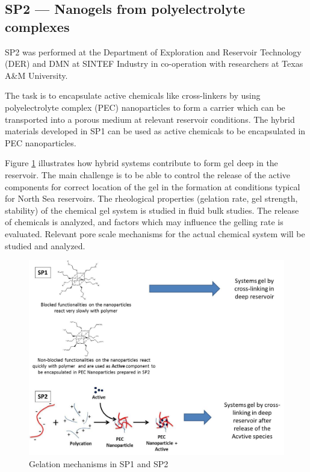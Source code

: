 \subsection*{SP2 --- Nanogels from polyelectrolyte complexes}

SP2 was performed at the Department of Exploration and Reservoir Technology (DER) and DMN at SINTEF Industry in co-operation with researchers at Texas A\&M University.

The task is to encapsulate active chemicals like cross-linkers by using polyelectrolyte complex  (PEC) nanoparticles to form a carrier which can be transported into a porous medium at relevant reservoir conditions. The hybrid materials developed in SP1 can be used as active chemicals to be encapsulated in PEC nanoparticles. 

Figure \ref{fig:sp1sp2} illustrates how hybrid systems contribute to form gel deep in the reservoir. The main challenge is to be able to control the release of the active components for correct location of the gel in the formation at conditions typical for North Sea reservoirs. The rheological properties (gelation rate, gel strength, stability) of the chemical gel system is studied in fluid bulk studies. The release of chemicals is analyzed, and factors which may influence the gelling rate is evaluated. Relevant pore scale mechanisms for the actual chemical system will be studied and analyzed.

\begin{figure}
    \centering
    \includegraphics[width=\textwidth]{img/fig/sp1sp2.png}
    \caption{Gelation mechanisms in SP1 and SP2}
    \label{fig:sp1sp2}
\end{figure}

